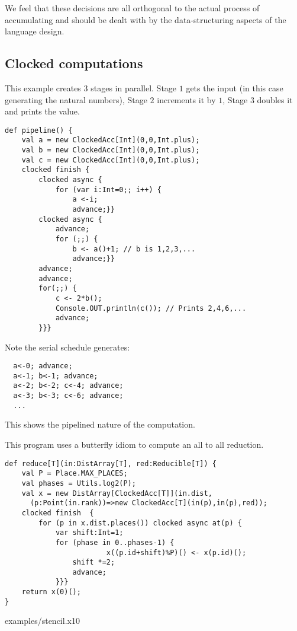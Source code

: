 We feel that these decisions are all orthogonal to the actual process
of accumulating and should be dealt with by the data-structuring
aspects of the language design.

\subsection{Clocked computations}

\begin{example}[Pipeline]
This example creates $3$ stages in parallel. Stage $1$ gets the input
(in this case generating the natural numbers), Stage $2$ increments it
by $1$, Stage $3$ doubles it and prints the value.
\begin{lstlisting}
def pipeline() {
    val a = new ClockedAcc[Int](0,0,Int.plus);
    val b = new ClockedAcc[Int](0,0,Int.plus);
    val c = new ClockedAcc[Int](0,0,Int.plus);
    clocked finish {
        clocked async {
            for (var i:Int=0;; i++) {
                a <-i;
                advance;}}
        clocked async {
            advance;
            for (;;) {
                b <- a()+1; // b is 1,2,3,...
                advance;}}
        advance;
        advance;
        for(;;) {
            c <- 2*b();
            Console.OUT.println(c()); // Prints 2,4,6,...
            advance;
        }}}
  \end{lstlisting}
Note the serial schedule generates:
\begin{lstlisting}
  a<-0; advance;
  a<-1; b<-1; advance;
  a<-2; b<-2; c<-4; advance;
  a<-3; b<-3; c<-6; advance;
  ...
\end{lstlisting}
\noindent This shows the pipelined nature of the computation.
\end{example}

\begin{example}
This program uses a butterfly idiom to compute an all to all
reduction. 
\begin{lstlisting}
def reduce[T](in:DistArray[T], red:Reducible[T]) {
    val P = Place.MAX_PLACES;
    val phases = Utils.log2(P);
    val x = new DistArray[ClockedAcc[T]](in.dist,
      (p:Point(in.rank))=>new ClockedAcc[T](in(p),in(p),red));
    clocked finish  {
    	for (p in x.dist.places()) clocked async at(p) {
    		var shift:Int=1;
    		for (phase in 0..phases-1) {
                        x((p.id+shift)%P)() <- x(p.id)();
    			shift *=2;
    			advance;
    		}}}
    return x(0)();
}
\end{lstlisting}
\end{example}

 {examples/stencil.x10}
